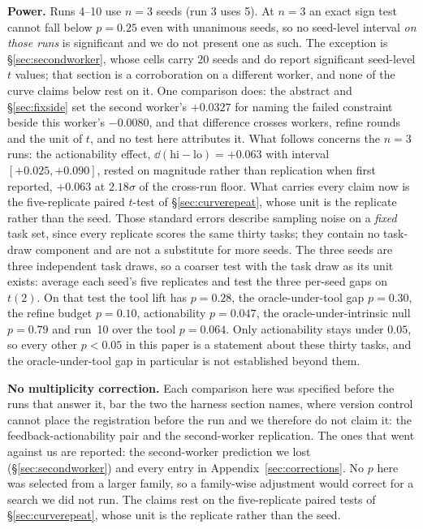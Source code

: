 \documentclass[11pt]{article}
\begin{document}
\textbf{Power.} Runs 4--10 use $n{=}3$ seeds (run 3 uses 5). At $n{=}3$ an exact sign test cannot
fall below $p=0.25$ even with unanimous seeds, so no seed-level interval \emph{on those runs} is
significant and we do not present one as such. The exception is
\S\ref{sec:secondworker}, whose cells carry $20$ seeds and do report significant seed-level
$t$ values; that section is a corroboration on a different worker, and none of the curve claims
below rest on it. One comparison does: the abstract and \S\ref{sec:fixside} set the second
worker's $+0.0327$ for naming the failed constraint beside this worker's $-0.0080$, and that
difference crosses workers, refine rounds and the unit of $t$, and no test here attributes it. What follows concerns the $n{=}3$ runs: the actionability effect,
$\dd(\text{hi}-\text{lo})=+0.063$ with interval $[+0.025,+0.090]$, rested on magnitude rather than
replication when first reported, $+0.063$ at $2.18\sigma$ of the cross-run floor.
What carries every claim now is the five-replicate
paired $t$-test of \S\ref{sec:curverepeat}, whose unit is the replicate rather than the seed.
Those standard errors describe sampling noise on a \emph{fixed} task set, since every replicate
scores the same thirty tasks; they contain no task-draw component and are not a substitute for
more seeds. The three seeds are three independent task draws, so a coarser test with the task draw
as its unit exists: average each seed's five replicates and test the three per-seed gaps on
$t(2)$. On that test the tool lift has $p = 0.28$, the oracle-under-tool gap $p = 0.30$, the refine
budget $p = 0.10$, actionability $p = 0.047$, the oracle-under-intrinsic null $p = 0.79$ and run~10
over the tool $p = 0.064$. Only actionability stays under $0.05$, so every other $p<0.05$ in this
paper is a statement about these thirty tasks, and the oracle-under-tool gap in particular is not
established beyond them.

\textbf{No multiplicity correction.} Each comparison here was specified before the runs that
answer it, bar the two the harness section names, where version control cannot place the
registration before the run and we therefore do not claim it: the feedback-actionability pair and
the second-worker replication. The ones that went against us are reported: the second-worker prediction we lost
(\S\ref{sec:secondworker}) and every entry in Appendix~\ref{sec:corrections}. No $p$ here was
selected from a larger family, so a family-wise adjustment would correct for a search we did not
run. The claims rest on the five-replicate paired tests of \S\ref{sec:curverepeat}, whose unit
is the replicate rather than the seed.
\end{document}
